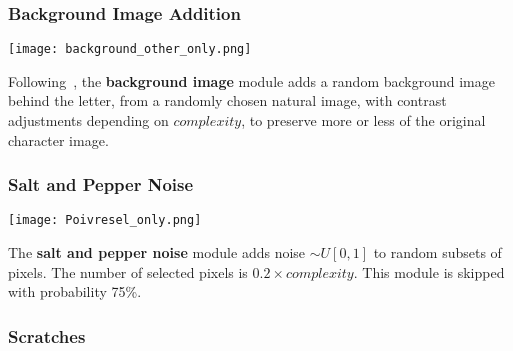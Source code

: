 \documentclass[smallcondensed]{svjour3}     %
\begin{document}

\subsubsection*{Background Image Addition}

\begin{minipage}[t]{\linewidth}
\begin{minipage}[t]{0.14\linewidth}
\centering
\vspace*{0mm}
\texttt{[image: background\_other\_only.png]}
\end{minipage}%
\hspace{0.3cm}\begin{minipage}[t]{0.83\linewidth}
\vspace*{1mm}
Following~\citet{Larochelle-jmlr-2009}, the {\bf background image} module adds a random
background image behind the letter, from a randomly chosen natural image,
with contrast adjustments depending on $complexity$, to preserve
more or less of the original character image.
\end{minipage}
\end{minipage}

\subsubsection*{Salt and Pepper Noise}

\begin{minipage}[t]{0.14\linewidth}
\centering
\vspace*{0mm}
\texttt{[image: Poivresel\_only.png]}
\end{minipage}%
\hspace{0.3cm}\begin{minipage}[t]{0.83\linewidth}
\vspace*{1mm}
The {\bf salt and pepper noise} module adds noise $\sim U[0,1]$ to random subsets of pixels.
The number of selected pixels is $0.2 \times complexity$.
This module is skipped with probability 75\%.
\end{minipage}

\subsubsection*{Scratches}
\end{document}
